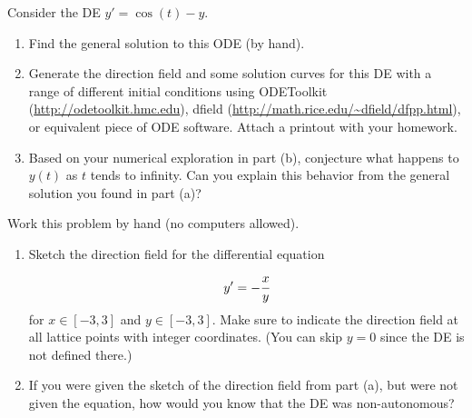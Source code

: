 \documentclass[12pt,letterpaper]{hmcpset}
\begin{document}
\begin{problem}[3]
Consider the DE $y' = \cos(t)-y$.
\begin{enumerate}
  	\item Find the general solution to this ODE (by hand).
  	\item Generate the direction field and some solution curves
          for this DE with a range of different
          initial conditions using ODEToolkit (\url{http://odetoolkit.hmc.edu}), dfield
          (\url{http://math.rice.edu/~dfield/dfpp.html}), or
           equivalent piece of ODE software. Attach a printout with
          your homework.
  	\item Based on your numerical exploration in part (b), conjecture what happens to $y(t)$ as $t$ tends to infinity. Can you explain this behavior from the general solution you found in part (a)?
\end{enumerate}
\end{problem}

\begin{solution}
  \vfill
\end{solution}
\newpage

\begin{problem}[4]
Work this problem by hand (no computers allowed).
\begin{enumerate}
\item Sketch the direction field for the differential equation
$$y' = -\cfrac{x}{y}$$
for $x\in\left[-3,3\right]$ and $y\in\left[-3,3\right]$.  Make sure to indicate the direction field at all lattice points with integer coordinates. (You can skip $y=0$ since the DE is not defined there.)
\item If you were given the sketch of the direction field from part (a), but were not given the equation, how would you know that the DE was non-autonomous?
\end{enumerate}
\end{problem}

\begin{solution}
  \vfill
\end{solution}
\newpage
\end{document}
